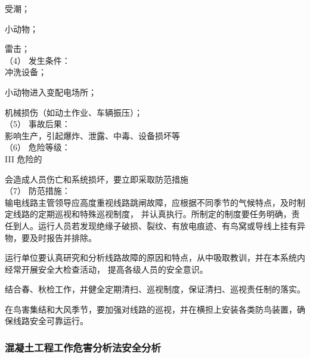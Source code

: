  受潮；

 小动物；

 雷击；\\

（4） 发生条件：\\

 冲洗设备；

 小动物进入变配电场所；

 机械损伤（如动土作业、车辆振压）；\\


（5） 事故后果：\\

影响生产，引起爆炸、泄露、中毒、设备损坏等\\

（6） 危险等级：\\

III 危险的

会造成人员伤亡和系统损坏，要立即采取防范措施\\

（7） 防范措施：\\

 输电线路主管领导应高度重视线路跳闸故障，应根据不同季节的气候特点，及时制定线路的定期巡视和特殊巡视制度，
并认真执行。所制定的制度要任务明确，责任到人。运行人员若发现绝缘子破损、裂纹、有放电痕迹、有鸟窝或导线上挂有异物，要及时报告并排除。 

 运行单位要认真研究和分析线路故障的原因和特点，从中吸取教训，并在本系统内经常开展安全大检查活动，
提高各级人员的安全意识。

 结合春、秋检工作，并健全定期清扫、巡视制度，保证清扫、巡视责任制的落实。

 在鸟害集结和大风季节，要加强对线路的巡视，并在横担上安装各类防鸟装置，确保线路安全可靠运行。

\subsubsection{混凝土工程工作危害分析法安全分析}

